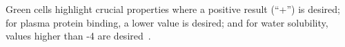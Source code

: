 \begin{table*}
\begin{scriptsize}
\begin{threeparttable}
\begin{tablenotes}
\begin{footnotesize}
	Green cells highlight crucial properties where a positive result (``+'') is desired; for plasma protein binding, a lower value is desired; and for water solubility, values higher than -4 are desired~\cite{logs}.
\!\! \par
		\par
		\end{footnotesize}
	\end{tablenotes}
\end{threeparttable}
\end{scriptsize}
  \vspace{--10pt}    
\end{table*}

